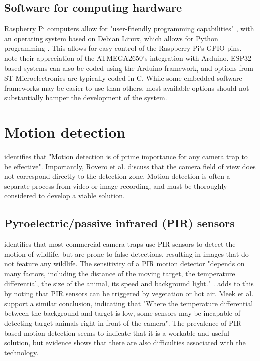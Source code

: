 \documentclass[class=report,11pt,crop=false]{standalone}
\begin{document}
\subsection{Software for computing hardware}

Raspberry Pi computers allow for "user-friendly programming capabilities" \cite{jolles2021broad-scale}, with an operating system based on Debian Linux, which allows for Python programming \cite{prinz2016a}. This allows for easy control of the Raspberry Pi's GPIO pins. \cite{camacho2017deployment} note their appreciation of the ATMEGA2650's integration with Arduino. ESP32-based systems can also be coded using the Arduino framework, and options from ST Microelectronics are typically coded in C. While some embedded software frameworks may be easier to use than others, most available options should not substantially hamper the development of the system.

\section{Motion detection}

\cite{meek2012user} identifies that "Motion detection is of prime importance for any camera trap to be effective". Importantly, Rovero et al. \cite{rovero2013which} discuss that the camera field of view does not correspond directly to the detection zone. Motion detection is often a separate process from video or image recording, and must be thoroughly considered to develop a viable solution.

\subsection{Pyroelectric/passive infrared (PIR) sensors}

\cite{meek2012user} identifies that most commercial camera traps use PIR sensors to detect the motion of wildlife, but are prone to false detections, resulting in images that do not feature any wildlife. The sensitivity of a PIR motion detector "depends on many factors, including the distance of the moving target, the temperature differential, the size of the animal, its speed and background light." \cite{meek2012user}. \cite{rovero2013which} adds to this by noting that PIR sensors can be triggered by vegetation or hot air. Meek et al. \cite{meek2012introduction} support a similar conclusion, indicating that "Where the temperature differential between the background and target is low, some sensors may be incapable of detecting target animals right in front of the camera". The prevalence of PIR-based motion detection seems to indicate that it is a workable and useful solution, but evidence shows that there are also difficulties associated with the technology.
\end{document}
